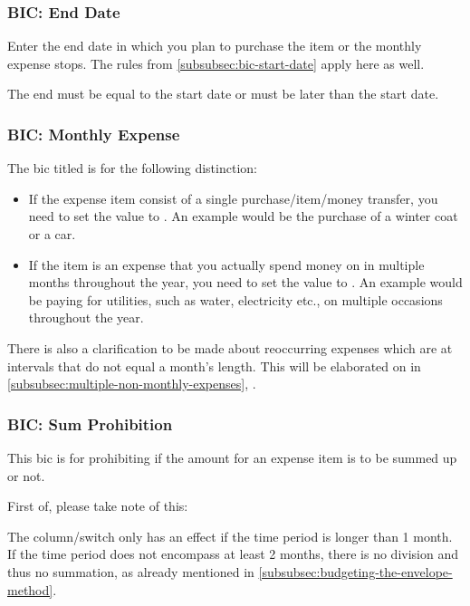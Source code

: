 \subsubsection{BIC: End Date}
\label{subsubsec:bic-end-date}

Enter the end date in which you plan to purchase the item or the monthly expense stops.
The rules from \autoref{subsubsec:bic-start-date} apply here as well.

\begin{specialnote}
	The end must be equal to the start date or must be later than the start date.
\end{specialnote}

\subsubsection{BIC: Monthly Expense}
\label{subsubsec:bic-monthly-expense}

The \ac{bic} titled  is for the following distinction:
\begin{itemize}
	\item If the expense item consist of a single purchase/item/money transfer, you need to set the value to .
	An example would be the purchase of a winter coat or a car.
	\item If the item is an expense that you actually spend money on in multiple months throughout the year, you need to set the value to .
	An example would be paying for \eg utilities, such as water, electricity etc., on multiple occasions throughout the year.
\end{itemize}

There is also a clarification to be made about reoccurring expenses which are at intervals that do not equal a month's length.
This will be elaborated on in \autoref{subsubsec:multiple-non-monthly-expenses}, .

\subsubsection{BIC: Sum Prohibition}
\label{subsubsec:bic-sum-prohibition}

This \ac{bic} is for prohibiting if the amount for an expense item is to be summed up or not.

First of, please take note of this:
\begin{specialnote}
	The column/switch  only has an effect if the time period is longer than 1 month.
	If the time period does not encompass at least 2 months, there is no division and thus no summation, as already mentioned in \autoref{subsubsec:budgeting-the-envelope-method}.
\end{specialnote}

